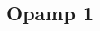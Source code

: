 \documentclass[resume]{subfiles}
\begin{document}
\begin{multicols}{3}
\section{Opamp 1}
\end{multicols}
\end{document}
